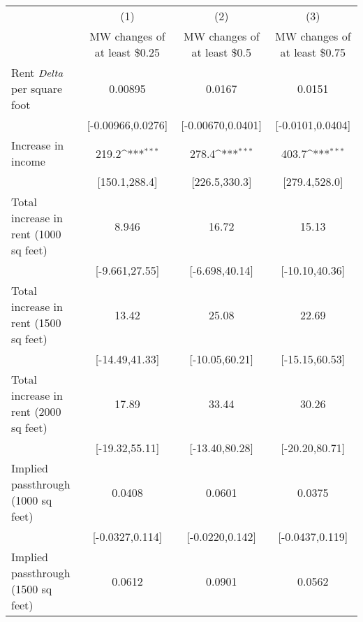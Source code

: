 {
\def\sym#1{\ifmmode^{#1}\else\(^{#1}\)\fi}
\begin{tabular}{l*{3}{c}}
\hline\hline
            &\multicolumn{1}{c}{(1)}        &\multicolumn{1}{c}{(2)}        &\multicolumn{1}{c}{(3)}        \\
            &\multicolumn{1}{c}{MW changes of at least \$0.25}&\multicolumn{1}{c}{MW changes of at least \$0.5}&\multicolumn{1}{c}{MW changes of at least \$0.75}\\
\hline
Rent $ \\Delta$ per square foot&               0.00895         &                0.0167         &                0.0151         \\
            &     [-0.00966,0.0276]         &     [-0.00670,0.0401]         &      [-0.0101,0.0404]         \\
[1em]
Increase in income&                 219.2\sym{***}&                 278.4\sym{***}&                 403.7\sym{***}\\
            &         [150.1,288.4]         &         [226.5,330.3]         &         [279.4,528.0]         \\
[1em]
Total increase in rent (1000 sq feet)&                 8.946         &                 16.72         &                 15.13         \\
            &        [-9.661,27.55]         &        [-6.698,40.14]         &        [-10.10,40.36]         \\
[1em]
Total increase in rent (1500 sq feet)&                 13.42         &                 25.08         &                 22.69         \\
            &        [-14.49,41.33]         &        [-10.05,60.21]         &        [-15.15,60.53]         \\
[1em]
Total increase in rent (2000 sq feet)&                 17.89         &                 33.44         &                 30.26         \\
            &        [-19.32,55.11]         &        [-13.40,80.28]         &        [-20.20,80.71]         \\
[1em]
Implied passthrough (1000 sq feet)&                0.0408         &                0.0601         &                0.0375         \\
            &       [-0.0327,0.114]         &       [-0.0220,0.142]         &       [-0.0437,0.119]         \\
[1em]
Implied passthrough (1500 sq feet)&                0.0612         &                0.0901         &                0.0562         \\

\end{tabular}}
